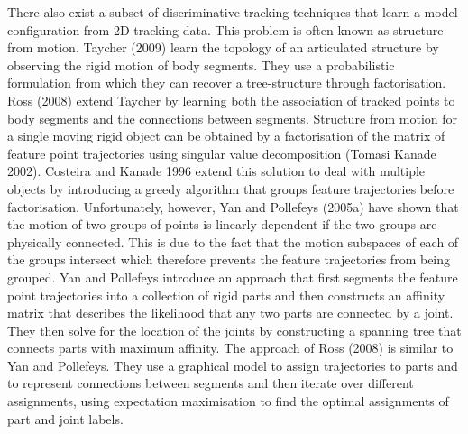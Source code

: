 There also exist a subset of discriminative tracking techniques that learn a model configuration from 2D tracking data. This problem is often known as structure from motion. Taycher (2009) learn the topology of an articulated structure by observing the rigid motion of body segments. They use a probabilistic formulation from which they can recover a tree-structure through factorisation. Ross (2008) extend Taycher by learning both the association of tracked points to body segments and the connections between segments. Structure from motion for a single moving rigid object can be obtained by a factorisation of the matrix of feature point trajectories using singular value decomposition (Tomasi Kanade 2002). Costeira and Kanade 1996 extend this solution to deal with multiple objects by introducing a greedy algorithm that groups feature trajectories before factorisation. Unfortunately, however, Yan and Pollefeys (2005a) have shown that the motion of two groups of points is linearly dependent if the two groups are physically connected. This is due to the fact that the motion subspaces of each of the groups intersect which therefore prevents the feature trajectories from being grouped. Yan and Pollefeys introduce an approach that first segments the feature point trajectories into a collection of rigid parts and then constructs an affinity matrix that describes the likelihood that any two parts are connected by a joint. They then solve for the location of the joints by constructing a spanning tree that connects parts with maximum affinity. The approach of Ross (2008) is similar to Yan and Pollefeys. They use a graphical model to assign trajectories to parts and to represent connections between segments and then iterate over different assignments, using expectation maximisation to find the optimal assignments of part and joint labels.  


































